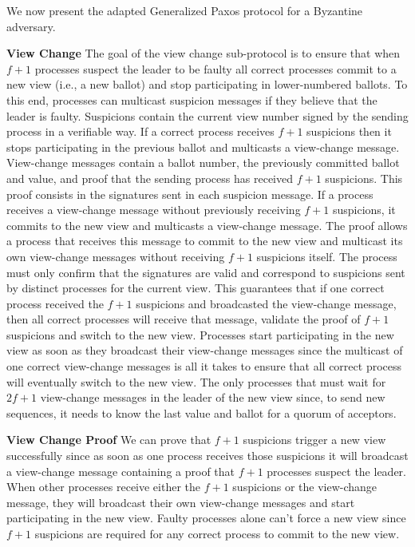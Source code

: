 
We now present the adapted Generalized Paxos protocol for a Byzantine adversary.\par
\textbf{View Change} The goal of the view change sub-protocol is to ensure that when $f+1$ processes suspect the leader to be faulty all correct processes commit to a new view (i.e., a new ballot) and stop participating in lower-numbered ballots. To this end, processes can multicast suspicion messages if they believe that the leader is faulty. Suspicions contain the current view number signed by the sending process in a verifiable way. If a correct process receives $f+1$ suspicions then it stops participating in the previous ballot and multicasts a view-change message. View-change messages contain a ballot number, the previously committed ballot and value, and proof that the sending process has received $f+1$ suspicions. This proof consists in the signatures sent in each suspicion message. If a process receives a view-change message without previously receiving $f+1$ suspicions, it commits to the new view and multicasts a view-change message.  The proof allows a process that receives this message to commit to the new view and multicast its own view-change messages without receiving $f+1$ suspicions itself. The process must only confirm that the signatures are valid and correspond to suspicions sent by distinct processes for the current view. This guarantees that if one correct process received the $f+1$ suspicions and broadcasted the view-change message, then all correct processes will receive that message, validate the proof of $f+1$ suspicions and switch to the new view. Processes start participating in the new view as soon as they broadcast their view-change messages since the multicast of one correct view-change messages is all it takes to ensure that all correct process will eventually switch to the new view. The only processes that must wait for $2f+1$ view-change messages in the leader of the new view since, to send new sequences, it needs to know the last value and ballot for a quorum of acceptors.\par
\textbf{View Change Proof} We can prove that $f+1$ suspicions trigger a new view successfully since as soon as one process receives those suspicions it will broadcast a view-change message containing a proof that $f+1$ processes suspect the leader. When other processes receive either the $f+1$ suspicions or the view-change message, they will broadcast their own view-change messages and start participating in the new view. Faulty processes alone can't force a new view since $f+1$ suspicions are required for any correct process to commit to the new view.\par
